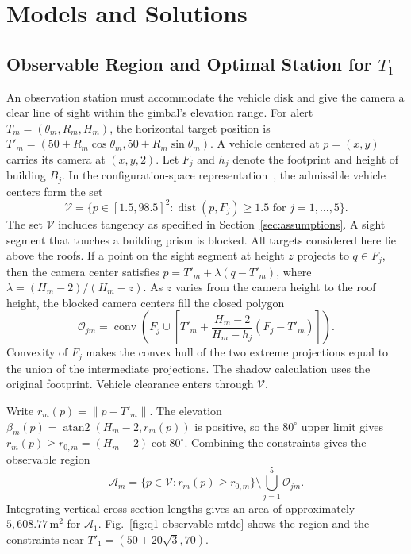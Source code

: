 \documentclass{swmcmthesis}
\begin{document}
\section{Models and Solutions}
\label{sec:models}

\subsection{Observable Region and Optimal Station for \texorpdfstring{\(T_1\)}{T1}}
\label{sec:q1-model}

An observation station must accommodate the vehicle disk and give the camera a clear line of sight within the gimbal's elevation range. For alert \(T_m=(\theta_m,R_m,H_m)\), the horizontal target position is \(T'_m=(50+R_m\cos\theta_m,50+R_m\sin\theta_m)\). A vehicle centered at \(p=(x,y)\) carries its camera at \((x,y,2)\). Let \(F_j\) and \(h_j\) denote the footprint and height of building \(B_j\). In the configuration-space representation~\cite{ref:configuration-space}, the admissible vehicle centers form the set
\begin{equation}
\label{eq:q1-admissible-centers}
\mathcal V=\{p\in[1.5,98.5]^2 : \operatorname{dist}(p,F_j)\ge 1.5
    \text{ for }j=1,\ldots,5\}.
\end{equation}
The set \(\mathcal V\) includes tangency as specified in Section~\ref{sec:assumptions}. A sight segment that touches a building prism is blocked. All targets considered here lie above the roofs. If a point on the sight segment at height \(z\) projects to \(q\in F_j\), then the camera center satisfies \(p=T'_m+\lambda(q-T'_m)\), where \(\lambda=(H_m-2)/(H_m-z)\). As \(z\) varies from the camera height to the roof height, the blocked camera centers fill the closed polygon
\begin{equation}
\label{eq:q1-building-shadow}
\mathcal O_{jm}=\operatorname{conv}\!\left(
    F_j\cup\left[T'_m+\frac{H_m-2}{H_m-h_j}(F_j-T'_m)\right]\right).
\end{equation}
Convexity of \(F_j\) makes the convex hull of the two extreme projections equal to the union of the intermediate projections. The shadow calculation uses the original footprint. Vehicle clearance enters through \(\mathcal V\).

Write \(r_m(p)=\|p-T'_m\|\). The elevation \(\beta_m(p)=\operatorname{atan2}(H_m-2,r_m(p))\) is positive, so the \(80^\circ\) upper limit gives \(r_m(p)\ge r_{0,m}=(H_m-2)\cot80^\circ\). Combining the constraints gives the observable region
\begin{equation}
\label{eq:q1-observable-region}
\mathcal A_m=\{p\in\mathcal V:r_m(p)\ge r_{0,m}\}
    \setminus\bigcup_{j=1}^5\mathcal O_{jm}.
\end{equation}
Integrating vertical cross-section lengths gives an area of approximately \(5{,}608.77\,\mathrm{m^2}\) for \(\mathcal A_1\). Fig.~\ref{fig:q1-observable-mtdc} shows the region and the constraints near \(T'_1=(50+20\sqrt{3},70)\).
\end{document}
